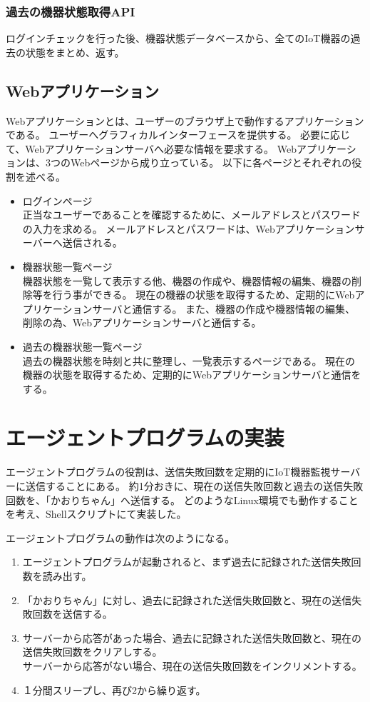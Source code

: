 \subsubsection{過去の機器状態取得API}
ログインチェックを行った後、機器状態データベースから、全てのIoT機器の過去の状態をまとめ、返す。

\subsection{Webアプリケーション}
Webアプリケーションとは、ユーザーのブラウザ上で動作するアプリケーションである。
ユーザーへグラフィカルインターフェースを提供する。
必要に応じて、Webアプリケーションサーバへ必要な情報を要求する。
Webアプリケーションは、3つのWebページから成り立っている。
以下に各ページとそれぞれの役割を述べる。
\begin{itemize}
	\item ログインページ\\
		正当なユーザーであることを確認するために、メールアドレスとパスワードの入力を求める。
		メールアドレスとパスワードは、Webアプリケーションサーバーへ送信される。
	\item 機器状態一覧ページ\\
		機器状態を一覧して表示する他、機器の作成や、機器情報の編集、機器の削除等を行う事ができる。
		現在の機器の状態を取得するため、定期的にWebアプリケーションサーバと通信する。
		また、機器の作成や機器情報の編集、削除の為、Webアプリケーションサーバと通信する。
	\item 過去の機器状態一覧ページ\\
		過去の機器状態を時刻と共に整理し、一覧表示するページである。
		現在の機器の状態を取得するため、定期的にWebアプリケーションサーバと通信をする。
\end{itemize}

\section{エージェントプログラムの実装}
エージェントプログラムの役割は、送信失敗回数を定期的にIoT機器監視サーバーに送信することにある。
約1分おきに、現在の送信失敗回数と過去の送信失敗回数を、「かおりちゃん」へ送信する。
どのようなLinux環境でも動作することを考え、Shellスクリプトにて実装した。
\medskip

エージェントプログラムの動作は次のようになる。
\begin{enumerate}
\item エージェントプログラムが起動されると、まず過去に記録された送信失敗回数を読み出す。
\item 「かおりちゃん」に対し、過去に記録された送信失敗回数と、現在の送信失敗回数を送信する。%
\item サーバーから応答があった場合、過去に記録された送信失敗回数と、現在の送信失敗回数をクリアしする。\\
サーバーから応答がない場合、現在の送信失敗回数をインクリメントする。
\item １分間スリープし、再び2から繰り返す。
\end{enumerate}


